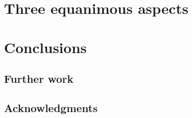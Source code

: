 \documentclass[a4paper, 11pt]{article} %
\begin{document}
\section{Three equanimous aspects}\label{sec:three}

\section{Conclusions}\label{sec:con}
\subsection{Further work}
\subsection{Acknowledgments}

%
%



\end{document}
